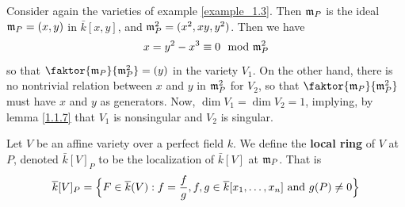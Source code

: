 \begin{example}\label{example_1.4}
    Consider again the varieties of example \ref{example_1.3}. Then $\mf_P$ is
    the ideal $\mf_P=(x,y)$ in $\bar{k}[x,y]$, and $\mf_P^2=(x^2,xy,y^2)$. Then
    we have
    \begin{equation*}
        x=y^2-x^3 \equiv 0 \mod{\mf_P^2}
    \end{equation*}
    so that $\faktor{\mf_P}{\mf_P^2}=(y)$ in the variety $V_1$. On the other
    hand, there is no nontrivial relation between $x$ and  $y$ in  $\mf_P^2$ for
     $V_2$, so that $\faktor{\mf_P}{\mf_P^2}$ must have $x$ and  $y$ as
     generators. Now,  $\dim{V_1}=\dim{V_2}=1$, implying, by lemma \ref{1.1.7}
     that $V_1$ is nonsingular and $V_2$ is singular.
\end{example}

\begin{definition}
    Let $V$ be an affine variety over a perfect field $k$. We define the
    \textbf{local ring} of $V$ at  $P$, denoted $\bar{k}[V]_P$ to be the
    localization of $\bar{k}[V]$ at $\mf_P$. That is
    \begin{equation*}
        \bar{k}[V]_P=\Big{\{} F \in \bar{k}(V) : f=\frac{f}{g}, f,g \in
            \bar{k}[x_1, \dots, x_n] \text{ and } g(P) \neq 0 \Big{\}}
    \end{equation*}
\end{definition}
